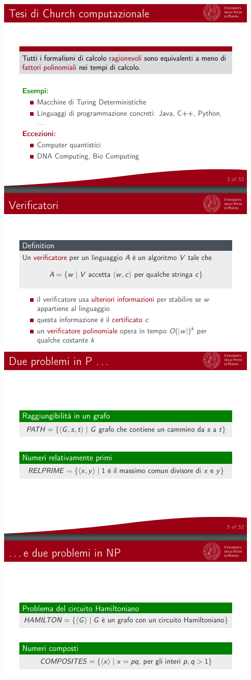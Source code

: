 \documentclass[]{article}
\begin{document}
			\begin{center}
				\includegraphics[scale=0.8]{NP1.png}
				\includegraphics[scale=0.8]{NP2.png}

\end{center}
\end{document}
